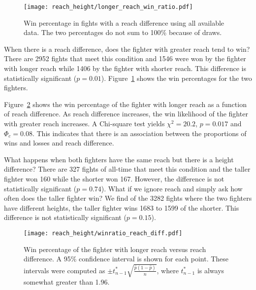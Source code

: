 \clearpage

\begin{figure}[h]
\begin{center}
\texttt{[image: reach\_height/longer\_reach\_win\_ratio.pdf]}
\caption{Win percentage in fights with a reach difference using
all available data. The two percentages do not sum to 100\% because
of draws.}
\label{winratio_reach_diff_simple}
\end{center}
\end{figure}

When there is a reach difference, does the fighter
with greater reach tend to win?
There are 2952 fights that meet this condition and
1546 were won by the fighter with longer reach while
1406 by the fighter with shorter reach. This difference
is statistically significant ($p=0.01$).
Figure~\ref{winratio_reach_diff_simple}
shows the win percentages for the two fighters.

Figure~\ref{winratio_reach_diff}
shows the win percentage of the fighter with
longer reach as a function of reach difference.
As reach difference increases, the win likelihood of the fighter with greater reach
increases.
A Chi-square test yields $\chi^2=20.2$, $p=0.017$ and $\Phi_c=0.08$.
This indicates that there is an association between the proportions of wins and losses  
and reach difference.

What happens when both fighters have the same reach but there is
a height difference? There are 327 fights of all-time that meet this condition
and the taller fighter won 160 while the shorter won 167. However, the
difference is not statistically significant ($p=0.74$). What if we ignore reach
and simply ask how often does the taller fighter win? We find of the 3282 fights
where the two fighters have different heights, the taller fighter wins 1683 to
1599 of the shorter. This difference is not statistically significant ($p=0.15$).

\begin{figure}[h]
\begin{center}
\texttt{[image: reach\_height/winratio\_reach\_diff.pdf]}
\caption{Win percentage of the fighter with longer reach versus reach difference. A 95\%
confidence interval is shown for each point. These intervals were computed
as $\pm t_{n-1}^{*}\sqrt{\frac{\hat{p}(1-\hat{p})}{n}}$, where $t_{n-1}^{*}$ is always somewhat greater than
1.96.}
\label{winratio_reach_diff}
\end{center}
\end{figure}

